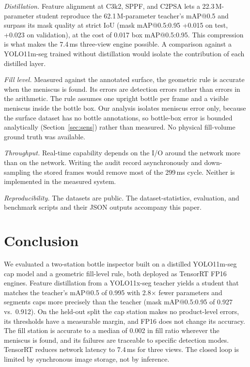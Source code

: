 \documentclass[conference]{IEEEtran}
\begin{document}
\textit{Distillation.} Feature alignment at C3k2, SPPF, and C2PSA lets a 22.3\,M-parameter student reproduce the 62.1\,M-parameter teacher's mAP@0.5 and surpass its mask quality at strict IoU (mask mAP@0.5:0.95 +0.015 on test, +0.023 on validation), at the cost of 0.017 box mAP@0.5:0.95. This compression is what makes the 7.4\,ms three-view engine possible. A comparison against a YOLO11m-seg trained without distillation would isolate the contribution of each distilled layer.

\textit{Fill level.} Measured against the annotated surface, the geometric rule is accurate when the meniscus is found. Its errors are detection errors rather than errors in the arithmetic. The rule assumes one upright bottle per frame and a visible meniscus inside the bottle box. Our analysis isolates meniscus error only, because the surface dataset has no bottle annotations, so bottle-box error is bounded analytically (Section~\ref{sec:sens}) rather than measured. No physical fill-volume ground truth was available.

\textit{Throughput.} Real-time capability depends on the I/O around the network more than on the network. Writing the audit record asynchronously and down-sampling the stored frames would remove most of the 299\,ms cycle. Neither is implemented in the measured system.

\textit{Reproducibility.} The datasets are public. The dataset-statistics, evaluation, and benchmark scripts and their JSON outputs accompany this paper.

\section{Conclusion}
We evaluated a two-station bottle inspector built on a distilled YOLO11m-seg cap model and a geometric fill-level rule, both deployed as TensorRT FP16 engines. Feature distillation from a YOLO11x-seg teacher yields a student that matches the teacher's mAP@0.5 of 0.995 with 2.8$\times$ fewer parameters and segments caps more precisely than the teacher (mask mAP@0.5:0.95 of 0.927 vs.\ 0.912). On the held-out split the cap station makes no product-level errors, its thresholds have a measurable margin, and FP16 does not change its accuracy. The fill station is accurate to a median of 0.002 in fill ratio wherever the meniscus is found, and its failures are traceable to specific detection modes. TensorRT reduces network latency to 7.4\,ms for three views. The closed loop is limited by synchronous image storage, not by inference.
\end{document}
